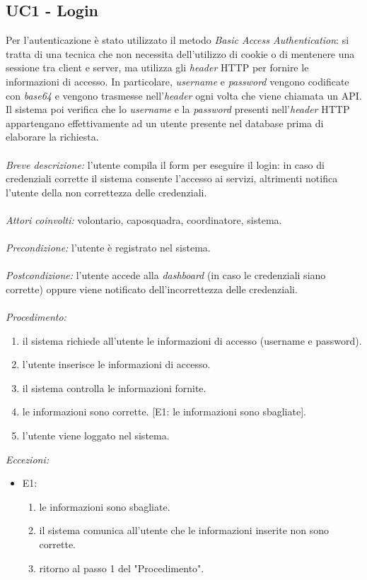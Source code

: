 \subsection{UC1 - Login}
Per l'autenticazione è stato utilizzato il metodo \textit{Basic Access Authentication}: si tratta di una tecnica che non necessita dell'utilizzo di cookie o di mentenere una sessione tra client e server, ma utilizza gli \textit{header} HTTP per fornire le informazioni di accesso. In particolare, \textit{username} e \textit{password} vengono codificate con \textit{base64} e vengono trasmesse nell'\textit{header} ogni volta che viene chiamata un API. Il sistema poi verifica che lo \textit{username} e la \textit{password} presenti nell'\textit{header} HTTP appartengano effettivamente ad un utente presente nel database prima di elaborare la richiesta. 
\\
\\
\textit{Breve descrizione:} l'utente compila il form per eseguire il login: in caso di credenziali corrette il sistema consente l'accesso ai servizi, altrimenti notifica l'utente della non correttezza delle credenziali. 
\\
\\
\textit{Attori coinvolti:} volontario, caposquadra, coordinatore, sistema.
\\
\\
\textit{Precondizione:} l'utente è registrato nel sistema.
\\
\\
\textit{Postcondizione:} l'utente accede alla \textit{dashboard} (in caso le credenziali siano corrette) oppure viene notificato dell'incorrettezza delle credenziali.
\\
\\
\textit{Procedimento:}
\begin{enumerate}
	\item il sistema richiede all'utente le informazioni di accesso (username e password).
	\item l'utente inserisce le informazioni di accesso.
	\item il sistema controlla le informazioni fornite.
	\item le informazioni sono corrette. [E1: le informazioni sono sbagliate].
	\item l'utente viene loggato nel sistema.
\end{enumerate}


\textit{Eccezioni:}
\begin{itemize}
	\item E1:
	\begin{enumerate}
		\item le informazioni sono sbagliate.
		\item il sistema comunica all'utente che le informazioni inserite non sono corrette.
		\item ritorno al passo 1 del "Procedimento".
	\end{enumerate}
\end{itemize}



